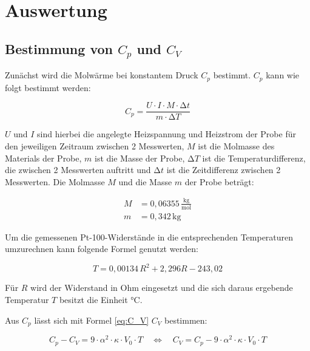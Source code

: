 \section{Auswertung}
\label{sec:Auswertung}

\subsection{Bestimmung von $C_p$ und $C_V$}
\label{sec:C_p-C_V}

Zunächst wird die Molwärme bei konstantem Druck $C_p$ bestimmt. $C_p$ kann wie folgt bestimmt werden:

\begin{equation}
    C_p = \frac{U \cdot I \cdot M \cdot \increment t}{m \cdot \increment T}
    \label{eq:C_p}
\end{equation}

$U$ und $I$ sind hierbei die angelegte Heizspannung und Heizstrom der Probe für den jeweiligen Zeitraum zwischen 2 Messwerten, $M$ ist die Molmasse des Materials der Probe, $m$ ist die Masse der Probe, $\increment T$ ist die Temperaturdifferenz, die zwischen 2 Messwerten auftritt und $\increment t$ ist die Zeitdifferenz zwischen 2 Messwerten. Die Molmasse $M$ und die Masse $m$ der Probe beträgt:

\begin{align*}
    M &= 0, \! 06355 \, \frac{\mathrm{kg}}{\mathrm{mol}} \\
    m &= 0, \! 342 \, \mathrm{kg}
\end{align*}

Um die gemessenen Pt-100-Widerstände in die entsprechenden Temperaturen umzurechnen kann folgende Formel genutzt werden:

\begin{equation}
    T = 0, \! 00134 \, R^2 + 2, \! 296 R - 243, \! 02
\end{equation}

Für $R$ wird der Widerstand in Ohm eingesetzt und die sich daraus ergebende Temperatur $T$ besitzt die Einheit °C.

Aus $C_p$ lässt sich mit Formel \eqref{eq:C_V} $C_V$ bestimmen:

\begin{equation}
    C_p - C_V = 9 \cdot \alpha^2 \cdot \kappa \cdot V_0 \cdot T \, \, \, \, \, \, \Leftrightarrow \, \, \, \, \, \, C_V = C_p - 9 \cdot \alpha^2 \cdot \kappa \cdot V_0 \cdot T
    \label{eq:C_V}
\end{equation}

